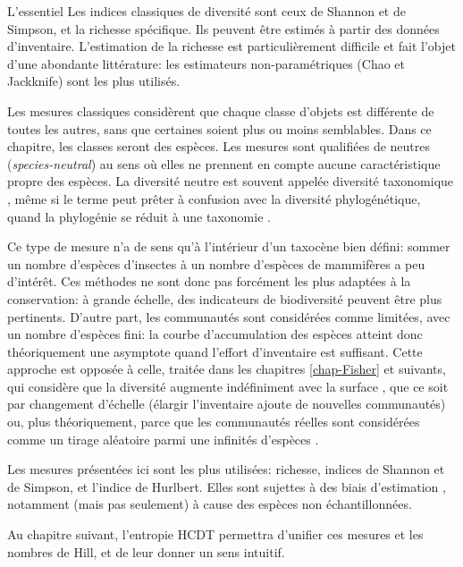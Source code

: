 \documentclass[
  11pt,
  american,
  a4paper,
  extrafontsizes,onecolumn,openright
  ]{memoir}
\newenvironment{Summary}
  {\begin{bclogo}[logo=\bctrombone, noborder=true, couleur=lightgray!50]{L'essentiel}\parindent0pt}
  {\end{bclogo}}
\newlength{\rf}
\begin{document}
\begin{Summary}
Les indices classiques de diversité sont ceux de Shannon et de Simpson, et la richesse spécifique.
Ils peuvent être estimés à partir des données d'inventaire.
L'estimation de la richesse est particulièrement difficile et fait l'objet d'une abondante littérature: les estimateurs non-paramétriques (Chao et Jackknife) sont les plus utilisés.

\end{Summary}

Les mesures classiques \autocite{Peet1974} considèrent que chaque classe d'objets est différente de toutes les autres, sans que certaines soient plus ou moins semblables.
Dans ce chapitre, les classes seront des espèces.
Les mesures sont qualifiées de neutres (\emph{species-neutral}) au sens où elles ne prennent en compte aucune caractéristique propre des espèces.
La diversité neutre est souvent appelée diversité taxonomique \autocite{Devictor2010,Stegen2011}, même si le terme peut prêter à confusion avec la diversité phylogénétique, quand la phylogénie se réduit à une taxonomie \autocite{Clarke2001,Ricotta2003c}.

Ce type de mesure n'a de sens qu'à l'intérieur d'un taxocène bien défini: sommer un nombre d'espèces d'insectes à un nombre d'espèces de mammifères a peu d'intérêt.
Ces méthodes ne sont donc pas forcément les plus adaptées à la conservation: à grande échelle, des indicateurs de biodiversité \autocite{Balmford2003} peuvent être plus pertinents.
D'autre part, les communautés sont considérées comme limitées, avec un nombre d'espèces fini: la courbe d'accumulation des espèces atteint donc théoriquement une asymptote quand l'effort d'inventaire est suffisant.
Cette approche est opposée à celle, traitée dans les chapitres \ref{chap-Fisher} et suivants, qui considère que la diversité augmente indéfiniment avec la surface \autocite{Williamson2001}, que ce soit par changement d'échelle (élargir l'inventaire ajoute de nouvelles communautés) ou, plus théoriquement, parce que les communautés réelles sont considérées comme un tirage aléatoire parmi une infinités d'espèces \autocite{Fisher1943}.

Les mesures présentées ici sont les plus utilisées: richesse, indices de Shannon et de Simpson, et l'indice de Hurlbert.
Elles sont sujettes à des biais d'estimation \autocite{Mouillot1999}, notamment (mais pas seulement) à cause des espèces non échantillonnées.

Au chapitre suivant, l'entropie HCDT permettra d'unifier ces mesures et les nombres de Hill, et de leur donner un sens intuitif.
\end{document}
